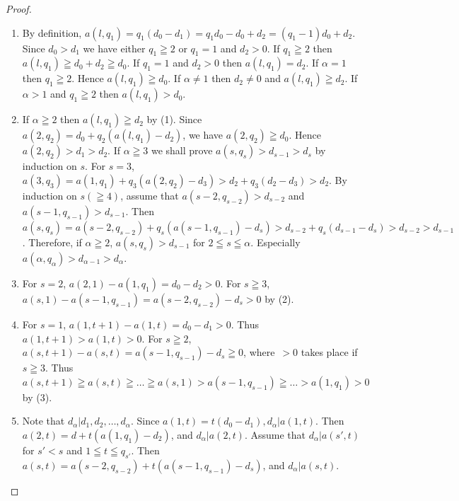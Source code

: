 \begin{proof}
\begin{enumerate}
\renewcommand{\labelenumi}{(\theenumi)}
\item By definition,
  $a(l,q_{1})=q_{1}(d_{0}-d_{1})=q_{1}d_{0}-d_{0}+d_{2}=(q_{1}-1)d_{0}+d_{2}$. Since
  $d_{0}>d_{1}$ we have either $q_{1}\geqq 2$ or $q_{1}=1$ and
  $d_{2}>0$. If $q_{1}\geqq 2$ then $a(l,q_{1})\geqq d_{0}+d_{2}\geqq
  d_{0}$. If $q_{1}=1$ and $d_{2}>0$ then $a(l,q_{1})=d_{2}$. If
  $\alpha=1$ then $q_{1}\geqq 2$. Hence $a(l,q_{1})\geqq d_{0}$. If
  $\alpha\neq 1$ then $d_{2}\neq 0$ and $a(l,q_{1})\geqq d_{2}$. If
  $\alpha>1$ and $q_{1}\geqq 2$ then $a(l,q_{1})>d_{0}$.

\item If $\alpha\geqq 2$ then $a(l,q_{1})\geqq d_{2}$ by (1). Since
  $a(2,q_{2})=d_{0}+q_{2}(a(l,q_{1})-d_{2})$, we have $a(2,q_{2})\geqq
  d_{0}$. Hence $a(2,q_{2})>d_{1}>d_{2}$. If $\alpha\geqq 3$ we shall
  prove $a(s,q_{s})>d_{s-1}>d_{s}$ by induction on $s$. For $s=3$,
  $a(3,q_{3})=a(1,q_{1})+q_{3}(a(2,q_{2})-d_{3})>d_{2}+q_{3}(d_{2}-d_{3})>d_{2}$. By
  induction on $s(\geqq 4)$, assume that $a(s-2,q_{s-2})>d_{s-2}$ and
  $a(s-1,q_{s-1})>d_{s-1}$. Then
  $a(s,q_{s})=a(s-2,q_{s-2})+q_{s}(a(s-1,q_{s-1})-d_{s})>d_{s-2}+q_{s}(d_{s-1}-d_{s})>d_{s-2}>d_{s-1}$. Therefore,
  if $\alpha\geqq 2$, $a(s,q_{s})>d_{s-1}$ for $2\leqq s\leqq
  \alpha$. Especially $a(\alpha,q_{\alpha})>d_{\alpha-1}>d_{\alpha}$.

\item For $s=2$, $a(2,1)-a(1,q_{1})=d_{0}-d_{2}>0$. For $s\geqq 3$,
  $a(s,1)-a(s-1,q_{s-1})=a(s-2,q_{s-2})-d_{s}>0$ by (2).

\item For $s=1$, $a(1,t+1)-a(1,t)=d_{0}-d_{1}>0$. Thus
  $a(1,t+1)>a(1,t)>0$. For $s\geqq 2$,
  $a(s,t+1)-a(s,t)=a(s-1,q_{s-1})-d_{s}\geqq 0$, where\pageoriginale\
  $>0$ takes place if $s\geqq 3$. Thus $a(s,t+1)\geqq
  a(s,t)\geqq\ldots \geqq
  a(s,1)>a(s-1,q_{s-1})\geqq\ldots>a(1,q_{1})>0$ by (3). 

\item Note that $d_{\alpha}|d_{1},d_{2},\ldots,d_{\alpha}$. Since
  $a(1,t)=t(d_{0}-d_{1}),d_{\alpha}|a(1,t)$. Then
  $a(2,t)=d+t(a(1,q_{1})-d_{2})$, and $d_{\alpha}|a(2,t)$. Assume that
  $d_{\alpha}|a(s',t)$ for $s'<s$ and $1\leqq t\leqq q_{s'}$. Then
  $a(s,t)=a(s-2,q_{s-2})+t(a(s-1,q_{s-1})-d_{s})$, and
  $d_{\alpha}|a(s,t)$.


\end{enumerate}
\end{proof}
